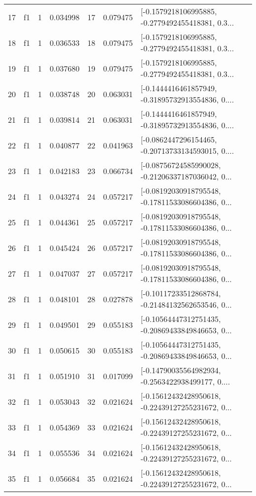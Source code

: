 \begin{tabular}{lllrlrl}
17  &  f1 &   1 &  0.034998 &   17 &  0.079475 &  [-0.1579218106995885, -0.2779492455418381, 0.3... \\
18  &  f1 &   1 &  0.036533 &   18 &  0.079475 &  [-0.1579218106995885, -0.2779492455418381, 0.3... \\
19  &  f1 &   1 &  0.037680 &   19 &  0.079475 &  [-0.1579218106995885, -0.2779492455418381, 0.3... \\
20  &  f1 &   1 &  0.038748 &   20 &  0.063031 &  [-0.1444416461857949, -0.31895732913554836, 0.... \\
21  &  f1 &   1 &  0.039814 &   21 &  0.063031 &  [-0.1444416461857949, -0.31895732913554836, 0.... \\
22  &  f1 &   1 &  0.040877 &   22 &  0.041963 &  [-0.0862447296154465, -0.20713733134593015, 0.... \\
23  &  f1 &   1 &  0.042183 &   23 &  0.066734 &  [-0.08756724585990028, -0.21206337187036042, 0... \\
24  &  f1 &   1 &  0.043274 &   24 &  0.057217 &  [-0.08192030918795548, -0.17811533086604386, 0... \\
25  &  f1 &   1 &  0.044361 &   25 &  0.057217 &  [-0.08192030918795548, -0.17811533086604386, 0... \\
26  &  f1 &   1 &  0.045424 &   26 &  0.057217 &  [-0.08192030918795548, -0.17811533086604386, 0... \\
27  &  f1 &   1 &  0.047037 &   27 &  0.057217 &  [-0.08192030918795548, -0.17811533086604386, 0... \\
28  &  f1 &   1 &  0.048101 &   28 &  0.027878 &  [-0.10117233512868784, -0.21484132562653546, 0... \\
29  &  f1 &   1 &  0.049501 &   29 &  0.055183 &  [-0.10564447312751435, -0.20869433849846653, 0... \\
30  &  f1 &   1 &  0.050615 &   30 &  0.055183 &  [-0.10564447312751435, -0.20869433849846653, 0... \\
31  &  f1 &   1 &  0.051910 &   31 &  0.017099 &  [-0.14790035564982934, -0.2563422938499177, 0.... \\
32  &  f1 &   1 &  0.053043 &   32 &  0.021624 &  [-0.15612432428950618, -0.22439127255231672, 0... \\
33  &  f1 &   1 &  0.054369 &   33 &  0.021624 &  [-0.15612432428950618, -0.22439127255231672, 0... \\
34  &  f1 &   1 &  0.055536 &   34 &  0.021624 &  [-0.15612432428950618, -0.22439127255231672, 0... \\
35  &  f1 &   1 &  0.056684 &   35 &  0.021624 &  [-0.15612432428950618, -0.22439127255231672, 0... \\

\end{tabular}
